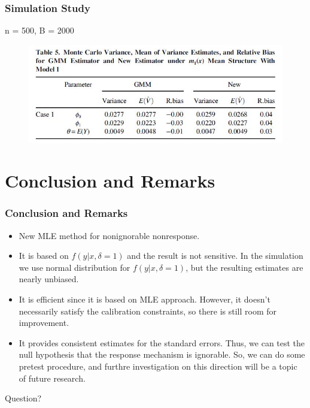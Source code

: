 \documentclass{beamer}
\newcommand{\bra}[1]{\left(#1\right)}
\newcommand{\e}[1]{$\displaystyle{#1}$}
\begin{document}
\begin{frame}
\frametitle{Simulation Study}
\centerline{n = 500, B = 2000}
\begin{figure}
\includegraphics[width=1\linewidth]{table5.jpg}
\end{figure}
\end{frame}

\section{Conclusion and Remarks}

\begin{frame}
\frametitle{Conclusion and Remarks}
\begin{itemize}
\item New MLE method for nonignorable nonresponse.\smallskip
\item It is based on \e{f\bra{y|x,\delta=1}} and the result is not sensitive. In the simulation we use normal distribution for \e{f\bra{y|x,\delta=1}}, but the resulting estimates are nearly unbiased.\smallskip
\item It is efficient since it is based on MLE approach. However, it doesn't necessarily satisfy the calibration constraints, so there is still room for improvement.\smallskip
\item It provides consistent estimates for the standard errors. Thus, we can test the null hypothesis that the response mechanism is ignorable. So, we can do some pretest procedure, and furthre investigation on this direction will be a topic of future research.
\end{itemize}
\end{frame}

\begin{frame}
\centerline{\huge{Question?}}
\end{frame}
\end{document}
